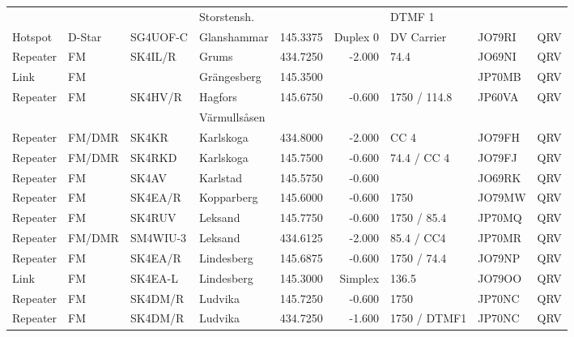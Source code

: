 \begin{longtable}{llllrrlll}
         &            &          & Storstensh.         &              &            & DTMF 1        &             &          \\
Hotspot  & D-Star     & SG4UOF-C & Glanshammar         & 145.3375     & Duplex 0   & DV Carrier    & JO79RI      & QRV      \\
Repeater & FM         & SK4IL/R  & Grums               & 434.7250     & -2.000     & 74.4          & JO69NI      & QRV      \\
Link     & FM         &          & Grängesberg         & 145.3500     &            &               & JP70MB      & QRV      \\
Repeater & FM         & SK4HV/R  & Hagfors             & 145.6750     & -0.600     & 1750 / 114.8  & JP60VA      & QRV      \\
         &            &          & Värmullsåsen        &              &            &               &             &          \\
Repeater & FM/DMR     & SK4KR    & Karlskoga           & 434.8000     & -2.000     & CC 4          & JO79FH      & QRV      \\
Repeater & FM/DMR     & SK4RKD   & Karlskoga           & 145.7500     & -0.600     & 74.4 / CC 4   & JO79FJ      & QRV      \\
Repeater & FM         & SK4AV    & Karlstad            & 145.5750     & -0.600     &               & JO69RK      & QRV      \\
Repeater & FM         & SK4EA/R  & Kopparberg          & 145.6000     & -0.600     & 1750          & JO79MW      & QRV      \\
Repeater & FM         & SK4RUV   & Leksand             & 145.7750     & -0.600     & 1750 / 85.4   & JP70MQ      & QRV      \\
Repeater & FM/DMR     & SM4WIU-3 & Leksand             & 434.6125     & -2.000     & 85.4 / CC4    & JP70MR      & QRV      \\
Repeater & FM         & SK4EA/R  & Lindesberg          & 145.6875     & -0.600     & 1750 / 74.4   & JO79NP      & QRV      \\
Link     & FM         & SK4EA-L  & Lindesberg          & 145.3000     & Simplex    & 136.5         & JO79OO      & QRV      \\
Repeater & FM         & SK4DM/R  & Ludvika             & 145.7250     & -0.600     & 1750          & JP70NC      & QRV      \\
Repeater & FM         & SK4DM/R  & Ludvika             & 434.7250     & -1.600     & 1750 / DTMF1  & JP70NC      & QRV      \\

\end{longtable}
